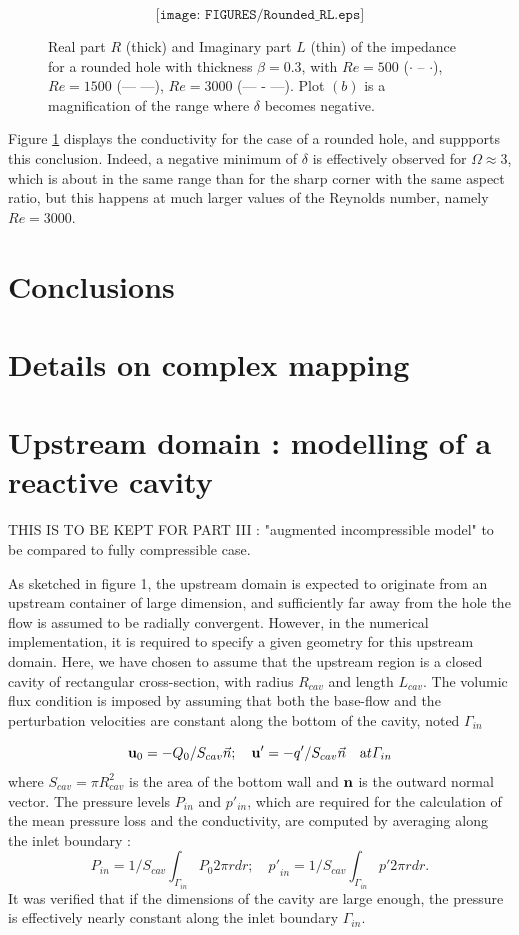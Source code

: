 \documentclass{jfm}
\newcommand\be{\begin{equation}}
\newcommand\ee{\end{equation}}
\begin{document}
\begin{figure}
$$
\texttt{[image: FIGURES/Rounded\_RL.eps]}
$$
\caption{ Real part $R$ (thick) and Imaginary part $L$ (thin) of the impedance 
for a rounded hole with thickness $\beta=0.3$, with
$Re = 500$ ($\cdot$ -- $\cdot$), $Re = 1500$ (---  ---), $Re = 3000$ (--- - ---).
Plot $(b)$ is a magnification of the range where $\delta$ becomes negative.
}
\label{fig:CondR}
\end{figure}

Figure \ref{fig:CondR} displays the conductivity for the case of a rounded hole, and suppports this conclusion. Indeed, a negative minimum of $\delta$ is effectively observed for $\Omega \approx 3$, which is about in the same range than for the sharp corner with the same aspect ratio, but this happens at much larger values of the Reynolds number, namely $Re = 3000$.




\section{Conclusions}


\appendix

\section{Details on complex mapping}


\section{Upstream domain : modelling of a reactive cavity}

THIS IS TO BE KEPT FOR PART III : "augmented incompressible model" to be compared to fully compressible case.


As sketched in figure 1, the upstream domain is expected to originate from an upstream container of large dimension, and sufficiently far away from the hole the flow is assumed to be radially convergent. However, in the numerical implementation, it is required to specify a given geometry for this upstream domain. Here, we have chosen to assume that the upstream region is a closed cavity of rectangular cross-section, with radius $R_{cav}$ and length $L_{cav}$. The volumic flux condition is imposed by assuming that both the base-flow and the perturbation velocities are constant along the bottom of the cavity, noted $\Gamma_{in}$

\be
 {\bf u}_0 = - Q_0/S_{cav} {\vec n} ; \quad {\bf u'} = - q'/S_{cav} {\vec n} \quad {\mbox at } \Gamma_{in}
\ee
where $S_{cav}= \pi R_{cav}^2$ is the area of the bottom wall and ${\bf n}$ is the outward normal vector.
The pressure levels $P_{in}$ and $p'_{in}$, which are required for the calculation of the mean pressure loss and the conductivity, are computed by averaging along the inlet boundary :
\be
 {P}_{in} = 1/S_{cav} \int_{\Gamma_{in}} P_0 2 \pi r dr ; \quad
  {p'}_{in} = 1/S_{cav} \int_{\Gamma_{in}} p' 2 \pi r dr.
\ee
It was verified that if the dimensions of the cavity are large enough, the pressure is effectively nearly constant along the inlet boundary $\Gamma_{in}$.
\end{document}
